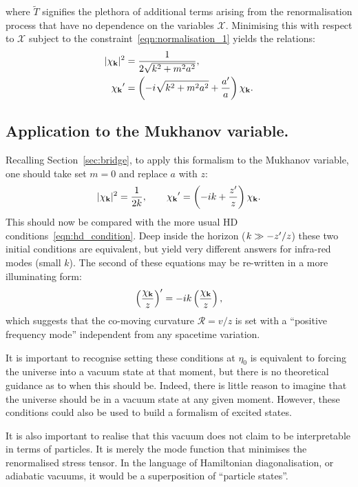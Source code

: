 where $\tilde{T}$ signifies the plethora of additional terms arising from the renormalisation process that have no dependence on the variables $\mathcal{X}$.
Minimising this with respect to $\mathcal{X}$ subject to the constraint~\eqref{eqn:normalisation_1} yields the relations:
\begin{align}
  |\chi_{\mathbf{k}}|^2 &= \frac{1}{2\sqrt{k^2+m^2a^2}}, \\
  {{\chi_{\mathbf{k}}}^\prime} &= \left( -i \sqrt{k^2+m^2a^2} + \frac{{{a}^\prime}}{a} \right) \chi_{\mathbf{k}}.
  \label{eqn:rn_condition_m}
\end{align}


\subsection{Application to the Mukhanov variable.}
Recalling Section~\ref{sec:bridge}, to apply this formalism to the Mukhanov variable, one should take set $m=0$ and replace $a$ with $z$:
\begin{equation}        
  |\chi_{\mathbf{k}}|^2 = \frac{1}{2k},\qquad
  {{\chi_{\mathbf{k}}}^\prime} = \left( -i k + \frac{{{z}^\prime}}{z} \right) \chi_{\mathbf{k}}.
  \label{eqn:rn_condition}
\end{equation}
This should now be compared with the more usual HD conditions~\eqref{eqn:hd_condition}. Deep inside the horizon (${k\gg -{{{z}^\prime}}/{z}}$) these two initial conditions are equivalent, but yield very different answers for infra-red modes (small $k$).
The second of these equations may be re-written in a more illuminating form:
\begin{equation}
  {{\left( \frac{\chi_{\mathbf{k}}}{z} \right)}^\prime} = -i k \left( \frac{\chi_{\mathbf{k}}}{z} \right),
\end{equation}
which suggests that the co-moving curvature $\mathcal{R}=v/z$ is set with a ``positive frequency mode'' independent from any spacetime variation.

It is important to recognise setting these conditions at $\eta_0$ is equivalent to forcing the universe into a vacuum state at that moment, but there is no theoretical guidance as to when this should be. Indeed, there is little reason to imagine that the universe should be in a vacuum state at any given moment. However, these conditions could also be used to build a formalism of excited states.

It is also important to realise that this vacuum does not claim to be interpretable in terms of particles. It is merely the mode function that minimises the renormalised stress tensor. In the language of Hamiltonian diagonalisation, or adiabatic vacuums, it would be a superposition of ``particle states''.

